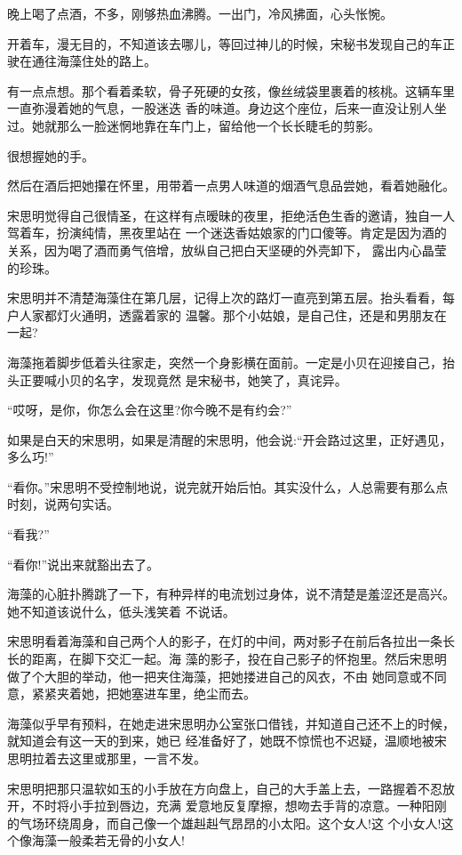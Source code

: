 \documentclass[11pt,a4paper,onecolumn]{article}
\begin{document}
晚上喝了点酒，不多，刚够热血沸腾。一出门，冷风拂面，心头怅惋。

开着车，漫无目的，不知道该去哪儿，等回过神儿的时候，宋秘书发现自己的车正驶在通往海藻住处的路上。

有一点点想。那个看着柔软，骨子死硬的女孩，像丝绒袋里裹着的核桃。这辆车里一直弥漫着她的气息，一股迷迭
香的味道。身边这个座位，后来一直没让别人坐过。她就那么一脸迷惘地靠在车门上，留给他一个长长睫毛的剪影。

很想握她的手。

然后在酒后把她攥在怀里，用带着一点男人味道的烟酒气息品尝她，看着她融化。

宋思明觉得自己很情圣，在这样有点暧昧的夜里，拒绝活色生香的邀请，独自一人驾着车，扮演纯情，黑夜里站在
一个迷迭香姑娘家的门口傻等。肯定是因为酒的关系，因为喝了酒而勇气倍增，放纵自己把白天坚硬的外壳卸下，
露出内心晶莹的珍珠。

宋思明并不清楚海藻住在第几层，记得上次的路灯一直亮到第五层。抬头看看，每户人家都灯火通明，透露着家的
温馨。那个小姑娘，是自己住，还是和男朋友在一起?

海藻拖着脚步低着头往家走，突然一个身影横在面前。一定是小贝在迎接自己，抬头正要喊小贝的名字，发现竟然
是宋秘书，她笑了，真诧异。

``哎呀，是你，你怎么会在这里?你今晚不是有约会?''

如果是白天的宋思明，如果是清醒的宋思明，他会说:``开会路过这里，正好遇见，多么巧!''

``看你。''宋思明不受控制地说，说完就开始后怕。其实没什么，人总需要有那么点时刻，说两句实话。

``看我?''

``看你!''说出来就豁出去了。

海藻的心脏扑腾跳了一下，有种异样的电流划过身体，说不清楚是羞涩还是高兴。她不知道该说什么，低头浅笑着
不说话。

宋思明看着海藻和自己两个人的影子，在灯的中间，两对影子在前后各拉出一条长长的距离，在脚下交汇一起。海
藻的影子，投在自己影子的怀抱里。然后宋思明做了个大胆的举动，他一把夹住海藻，把她搂进自己的风衣，不由
她同意或不同意，紧紧夹着她，把她塞进车里，绝尘而去。

海藻似乎早有预料，在她走进宋思明办公室张口借钱，并知道自己还不上的时候，就知道会有这一天的到来，她已
经准备好了，她既不惊慌也不迟疑，温顺地被宋思明拉着去这里或那里，一言不发。

宋思明把那只温软如玉的小手放在方向盘上，自己的大手盖上去，一路握着不忍放开，不时将小手拉到唇边，充满
爱意地反复摩擦，想吻去手背的凉意。一种阳刚的气场环绕周身，而自己像一个雄赳赳气昂昂的小太阳。这个女人!这
个小女人!这个像海藻一般柔若无骨的小女人!
\end{document}
